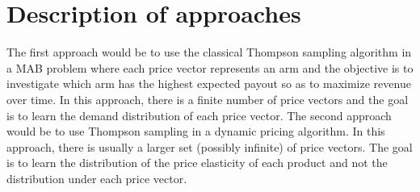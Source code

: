 \documentclass[a4paper]{article}
\begin{document}
\section{Description of approaches}
\label{sec:approach}
The first approach would be to use the classical Thompson sampling algorithm in a MAB problem where each price vector represents an arm and the objective is to investigate which arm has the highest expected payout so as to maximize revenue over time. In this approach, there is a finite number of price vectors and the goal is to learn the demand distribution of each price vector.
\newline
\newline
The second approach would be to use Thompson sampling in a dynamic pricing algorithm. In this approach, there is usually a larger set (possibly infinite) of price vectors. The goal is to learn the distribution of the price elasticity of each product and not the distribution under each price vector.
\end{document}
